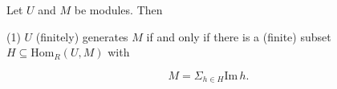 Let $U$ and $M$ be modules. Then

(1) $U$ (finitely) generates $M$ if and only if there is a (finite) subset $H \subseteq \mathrm{Hom}_R(U, M)$ with

$$M = \Sigma_{h \in H} \mathrm{Im}\, h.$$
